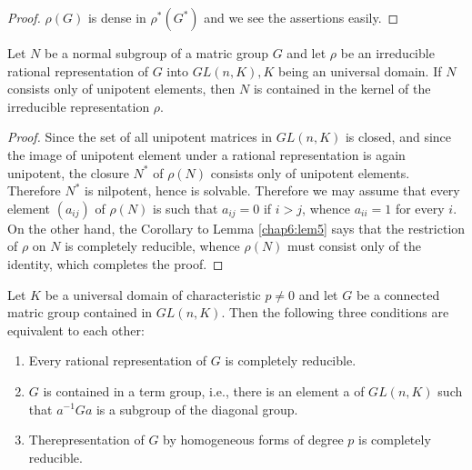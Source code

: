 \begin{proof}
  $\rho(G)$  is dense in $\rho^\ast (G^\ast)$ and we see the assertions easily. 
\end{proof}

\begin{lem}\label{chap6:lem9}%
  Let $N$ be a normal subgroup of a matric group $G$ and let $\rho$ be
  an irreducible rational representation of $G$ into $GL(n, K), K$
  being an universal domain.  If $N$ consists only of unipotent
  elements, then $N$ is contained in the kernel of the irreducible
  representation $\rho$. 
\end{lem}

\begin{proof}
  Since the set of all unipotent matrices in $GL(n, K)$ is closed, and
  since the image of unipotent element under a rational representation
  is again unipotent, the closure $N^\ast$ of $\rho(N)$ consists only
  of unipotent elements.  Therefore $N^\ast$ is nilpotent, hence is
  solvable.  Therefore we may assume that every element $(a_{ij})$ of
  $\rho(N)$ is such that $a_{ij}=0$ if $i > j$, whence $a_{ii}=1$
  for every $i$.  On the other hand, the Corollary to Lemma \ref{chap6:lem5} says
  that the restriction of $\rho$ on $N$ is completely reducible,
  whence $\rho (N)$ must consist only of the identity, which completes
  the proof. 
\end{proof}


\medskip
{}  

\setcounter{thm}{0}
\begin{thm}\label{chap6:thm1}%
  Let $K$ be a universal domain of characteristic $p \neq 0$ and let
  $G$ be a connected matric group contained in $GL(n,K)$.  Then the
  following three conditions are equivalent to each other: 
  \begin{enumerate}[\rm (I)]
  \item Every rational representation of $G$ is completely reducible.

  \item $G$ is contained in a term group, i.e., there is an element a
    of $GL(n, K)$ such that $a^{-1} Ga$ is a subgroup of the diagonal
    group. 

  \item The\pageoriginale representation of $G$ by homogeneous forms
    of degree $p$ is completely reducible. 
  \end{enumerate}
\end{thm}

